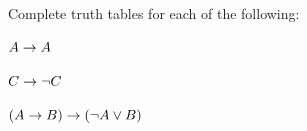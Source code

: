 \begin{practiceproblems}\label{pr:TT:TTorC}
	\problempart
	Complete truth tables for each of the following:
	\begin{problemslist}
		\item $A \rightarrow A$ %
		
		\item $C \rightarrow\neg C$ %
		\item $(A \rightarrow B) \rightarrow (\neg A\vee B)$ %
		

\end{problemslist}
\end{practiceproblems}
